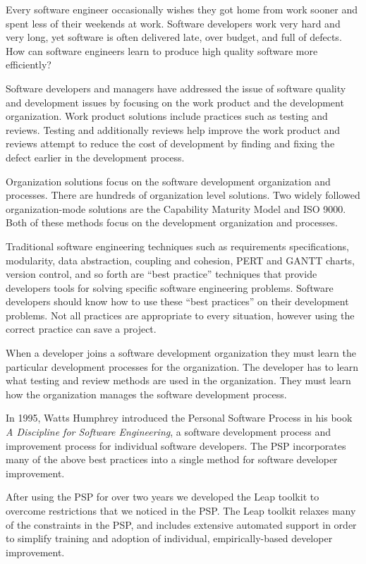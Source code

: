 Every software engineer occasionally wishes they got home from work sooner and spent
less of their weekends at work.  Software developers work very hard and very
long, yet software is often delivered late, over budget, and full of
defects. How can software engineers learn to produce high quality software more 
efficiently? 

Software developers and managers have addressed the issue of software quality
and development issues by focusing on the work product and the development
organization.  Work product solutions include practices such as testing and
reviews.  Testing and additionally reviews help improve the work product and
reviews attempt to reduce the cost of development by finding and fixing the
defect earlier in the development process.

Organization solutions focus on the software development organization and
processes.  There are hundreds of organization level solutions.  Two widely
followed organization-mode solutions are the Capability Maturity
Model\cite{Paulk95} and ISO 9000\cite{ISO9000}.  Both of these methods focus on
the development organization and processes.

Traditional software engineering techniques such as requirements
specifications, modularity, data abstraction, coupling and cohesion, PERT and
GANTT charts, version control, and so forth are ``best practice'' techniques
that provide developers tools for solving specific software engineering
problems. Software developers should know how to use these ``best practices''
on their development problems.  Not all practices are appropriate to every
situation, however using the correct practice can save a project.

When a developer joins a software development organization they must learn the
particular development processes for the organization.  The developer has to
learn what testing and review methods are used in the organization.  They must
learn how the organization manages the software development process.


In 1995, Watts Humphrey introduced the Personal Software Process in his book
{\em A Discipline for Software Engineering}\cite{Humphrey95}, a software
development process and improvement process for individual software developers.
The PSP incorporates many of the above best practices into a single method for
software developer improvement.

After using the PSP for over two years we developed the Leap toolkit to
overcome restrictions that we noticed in the PSP.  The Leap toolkit relaxes
many of the constraints in the PSP, and includes extensive automated support in 
order to simplify training and adoption of individual, empirically-based
developer improvement.

